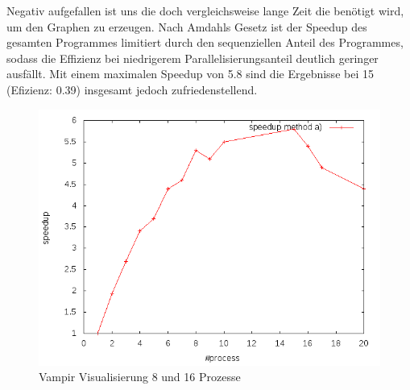 \documentclass[paper=A4,pagesize=auto,12pt,headinclude=true,footinclude=true,BCOR=0mm,DIV=calc]{scrartcl}
\begin{document}
	Negativ aufgefallen ist uns die doch vergleichsweise lange Zeit die benötigt wird, um den Graphen zu erzeugen. Nach Amdahls Gesetz \cite{PaPoBuch} ist der Speedup des gesamten Programmes limitiert durch den sequenziellen Anteil des Programmes, sodass die Effizienz bei niedrigerem Parallelisierungsanteil deutlich geringer ausfällt. Mit einem maximalen Speedup von 5.8 sind die Ergebnisse bei 15 (Efizienz: 0.39) insgesamt jedoch zufriedenstellend.
		\label{speedUpA}
		\begin{figure}[H]
			\includegraphics[scale = 0.55]{Prasentation/speedupPa.png}
			\caption{Vampir Visualisierung 8 und 16 Prozesse}
		\end{figure}
	
\end{document}
